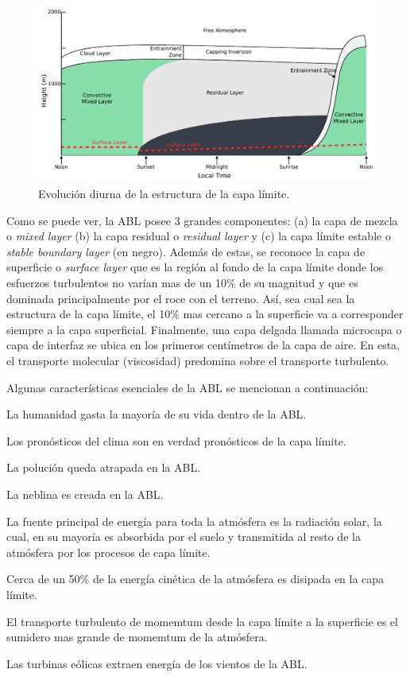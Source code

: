 \begin{figure}[h!]
	\centering
	\includegraphics[width=0.98\linewidth,trim={0cm 0cm 0cm 0cm},clip]{Imagenes/03/abl}
	\caption{Evolución diurna de la estructura de la capa límite.}
	\label{fig:03_abl}
\end{figure}

Como se puede ver, la ABL posee 3 grandes componentes: (a) la capa de mezcla o \emph{mixed layer} (b) la capa residual o \emph{residual layer} y (c) la capa límite estable o \emph{stable boundary layer} (en negro). Además de estas, se reconoce la capa de superficie o \emph{surface layer} que es la región al fondo de la capa límite donde los esfuerzos turbulentos no varían mas de un 10\% de su magnitud y que es dominada principalmente por el roce con el terreno. Así, sea cual sea la estructura de la capa límite, el 10\% mas cercano a la superficie va a corresponder siempre a la capa superficial. Finalmente, una capa delgada llamada microcapa o capa de interfaz se ubica en los primeros centímetros de la capa de aire. En esta, el transporte molecular (viscosidad) predomina sobre el transporte turbulento.

Algunas características esenciales de la ABL se mencionan a continuación:
\begin{itemize*}
	\item La humanidad gasta la mayoría de su vida dentro de la ABL.
	\item Los pronósticos del clima son en verdad pronósticos de la capa límite.
	\item La polución queda atrapada en la ABL.
	\item La neblina es creada en la ABL.
	\item La fuente principal de energía para toda la atmósfera es la radiación solar, la cual, en su mayoría es absorbida por el suelo y transmitida al resto de la atmósfera por los procesos de capa límite.
	\item Cerca de un 50\% de la energía cinética de la atmósfera es disipada en la capa límite.
	\item El transporte turbulento de momemtum desde la capa límite a la superficie es el sumidero mas grande de momemtum de la atmósfera.
	\item Las turbinas eólicas extraen energía de los vientos de la ABL.
\end{itemize*}
